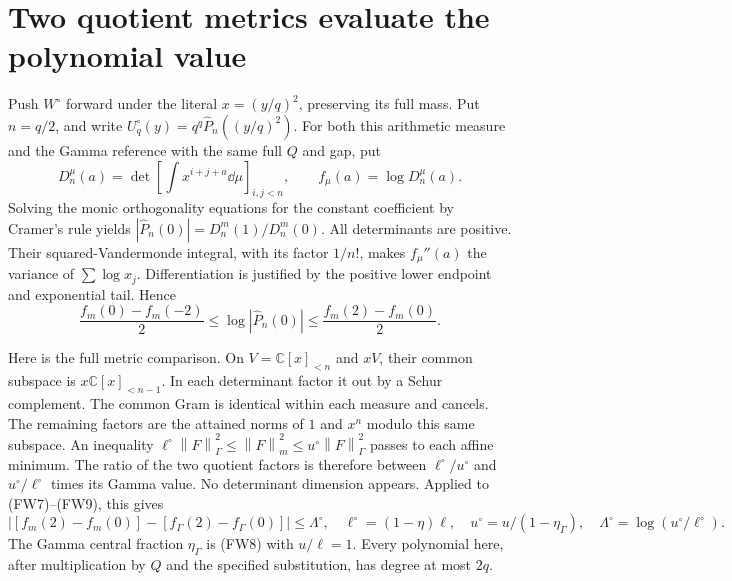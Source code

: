 \documentclass[11pt]{article}
\newcommand{\C}{\mathbb C}\newcommand{\R}{\mathbb R}
\newcommand{\norm}[1]{\left\lVert#1\right\rVert}
\begin{document}
\section{Two quotient metrics evaluate the polynomial value}
Push $W^\circ$ forward under the literal $x=(y/q)^2$, preserving its
full mass. Put $n=q/2$, and write
$U_q^\circ(y)=q^q\widehat P_n((y/q)^2)$. For both this arithmetic
measure and the Gamma reference with the same full $Q$ and gap, put
\[
 D_n^\mu(a)=\det[\int x^{i+j+a}\dd\mu]_{i,j<n},\qquad
 f_\mu(a)=\log D_n^\mu(a).
\]
Solving the monic orthogonality equations for the constant coefficient
by Cramer's rule yields $|\widehat P_n(0)|=D_n^m(1)/D_n^m(0)$.
All determinants are positive. Their squared-Vandermonde integral,
with its factor $1/n!$, makes $f_\mu''(a)$ the variance of
$\sum\log x_j$. Differentiation is justified by the positive lower
endpoint and exponential tail. Hence
\begin{equation}\tag{FW20}
 \frac{f_m(0)-f_m(-2)}2\le\log|\widehat P_n(0)|
 \le\frac{f_m(2)-f_m(0)}2.
\end{equation}

Here is the full metric comparison. On $V=\C[x]_{<n}$ and
$xV$, their common subspace is $x\C[x]_{<n-1}$. In each determinant
factor it out by a Schur complement. The common Gram is identical
within each measure and cancels. The remaining factors are the
attained norms of $1$ and $x^n$ modulo this same subspace.
An inequality $\ell^\circ\norm F_\Gamma^2\le\norm F_m^2
\le u^\circ\norm F_\Gamma^2$ passes to each affine minimum.
The ratio of the two quotient factors is therefore between
$\ell^\circ/u^\circ$ and $u^\circ/\ell^\circ$ times its Gamma value.
No determinant dimension appears. Applied to (FW7)--(FW9), this gives
\begin{equation}\tag{FW21}
 |[f_m(2)-f_m(0)]-[f_\Gamma(2)-f_\Gamma(0)]|
 \le\Lambda^\circ,\quad
 \ell^\circ=(1-\eta)\ell,\quad
 u^\circ=u/(1-\eta_\Gamma),\quad
 \Lambda^\circ=\log(u^\circ/\ell^\circ).
\end{equation}
The Gamma central fraction $\eta_\Gamma$ is (FW8) with $u/\ell=1$.
Every polynomial here, after multiplication by $Q$ and the specified
substitution, has degree at most $2q$.
\end{document}
